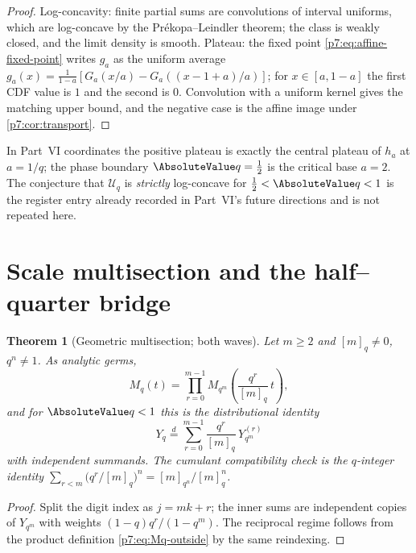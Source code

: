 \documentclass[11pt,oneside]{article}
\numberwithin{equation}{section}
\newtheorem{theorem}{Theorem}[section]
\theoremstyle{definition}
\theoremstyle{remark}
\begin{document}
\begin{proof}
Log-concavity: finite partial sums are convolutions of interval uniforms,
which are log-concave by the Pr\'ekopa--Leindler theorem; the class is
weakly closed, and the limit density is smooth.  Plateau: the fixed point \eqref{p7:eq:affine-fixed-point}
writes $g_a$ as the uniform average
$g_a(x)=\tfrac1{1-a}[G_a(x/a)-G_a((x-1+a)/a)]$; for $x\in[a,1-a]$ the first
CDF value is $1$ and the second is $0$.  Convolution with a uniform kernel
gives the matching upper bound, and the negative case is the affine image
under \cref{p7:cor:transport}.
\end{proof}

In Part~VI coordinates the positive plateau is exactly the central plateau of
$h_a$ at $a=1/q$; the phase boundary $\AbsoluteValue q=\tfrac12$ is the critical base
$a=2$.  The conjecture that $\mathcal U_q$ is \emph{strictly} log-concave for
$\tfrac12<\AbsoluteValue q<1$ is the register entry already recorded in Part~VI's
future directions and is not repeated here.

\section{Scale multisection and the half--quarter bridge}
\label{p7:sec:multisection}

\begin{theorem}[Geometric multisection; both waves]
\label{p7:thm:multisection}
Let $m\ge2$ and $[m]_q\ne0$, $q^n\ne1$.  As analytic germs,
\begin{equation}\label{p7:eq:M-multisection}
 \boxed{\ M_q(t)=\prod_{r=0}^{m-1}
 M_{q^m}\!\left(\frac{q^r}{[m]_q}\,t\right),\ }
\end{equation}
and for $\AbsoluteValue q<1$ this is the distributional identity
\begin{equation}\label{p7:eq:Y-multisection}
 Y_q\overset d=\sum_{r=0}^{m-1}\frac{q^r}{[m]_q}\,Y_{q^m}^{(r)}
\end{equation}
with independent summands.  The cumulant compatibility check is the
$q$-integer identity
$\sum_{r<m}\bigl(q^r/[m]_q\bigr)^n=[m]_{q^n}/[m]_q^n$.
\end{theorem}

\begin{proof}
Split the digit index as $j=mk+r$; the inner sums are independent copies of
$Y_{q^m}$ with weights $(1-q)q^r/(1-q^m)$.  The reciprocal regime follows from
the product definition \eqref{p7:eq:Mq-outside} by the same reindexing.
\end{proof}
\end{document}
